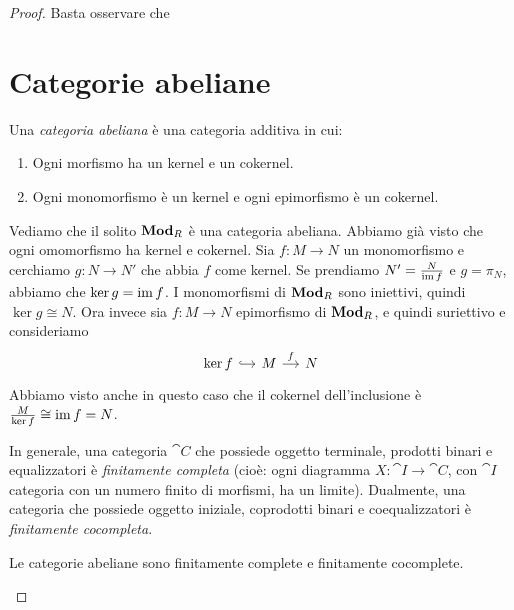 \begin{proof}
  Basta osservare che



\section{Categorie abeliane}

\begin{definition}\label{definition:AbelianCategories}
  Una {\em categoria abeliana} è una categoria additiva in cui:
  \begin{enumerate}[leftmargin=*]
  \item Ogni morfismo ha un kernel e un cokernel.
  \item Ogni monomorfismo è un kernel e ogni epimorfismo è un cokernel.
  \end{enumerate}
\end{definition}

\begin{example}
  Vediamo che il solito \(\mathbf{Mod}_R\) è una categoria abeliana. Abbiamo
  già visto che ogni omomorfismo ha kernel e cokernel. Sia
  \(f : M \to N\) un monomorfismo e cerchiamo \(g : N \to N'\) che abbia
  \(f\) come kernel. Se prendiamo \(N' = \frac{N}{\operatorname{im} f}\) e
  \(g = \pi_N\), abbiamo che \(\ker g = \operatorname{im} f\). I monomorfismi di
  \(\mathbf{Mod}_R\) sono iniettivi, quindi \(\ker g \cong N\). Ora invece sia
  \(f : M \to N\) epimorfismo di \(\mathbf{Mod}_R\), e quindi suriettivo e
  consideriamo
  \[
    \begin{tikzcd}[column sep=small]
      \ker f \ar["{}", r, hookrightarrow] & M \ar["{f}", r] & N
    \end{tikzcd}
  \]
  Abbiamo visto anche in questo caso che il cokernel dell'inclusione è
  \(\frac{M}{\ker f} \cong \operatorname{im} f = N\).
\end{example}

\begin{recall}
  In generale, una categoria \(\cat C\) che possiede oggetto terminale,
  prodotti binari e equalizzatori è {\em finitamente completa} (cioè:
  ogni diagramma \(X : \cat I \to \cat C\), con \(\cat I\) categoria con
  un numero finito di morfismi, ha un limite). Dualmente, una categoria
  che possiede oggetto iniziale, coprodotti binari e coequalizzatori è
  {\em finitamente cocompleta}.
\end{recall}

\begin{proposition}
  Le categorie abeliane sono finitamente complete e finitamente
  cocomplete.
\end{proposition}


\end{proof}
